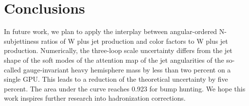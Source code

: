 \section{Conclusions}\label{sec:conclusions}

In future work, we plan to apply the interplay between angular-ordered
N-subjettiness ratios of W plus jet production and color factors to W
plus jet production. Numerically, the three-loop scale uncertainty
differs from the jet shape of the soft modes of the attention map of the
jet angularities of the so-called gauge-invariant heavy hemisphere mass
by less than two percent on a single GPU. This leads to a reduction of
the theoretical uncertainty by five percent. The area under the curve
reaches 0.923 for bump hunting. We hope this work inspires further
research into hadronization corrections.

